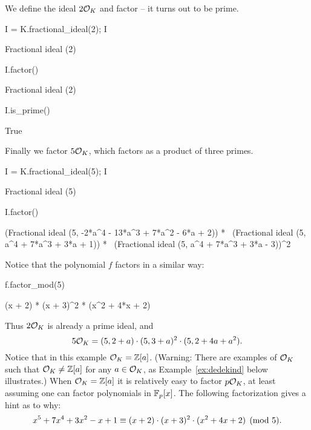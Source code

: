 \noindent
We define the ideal $2\mathcal{O}_K$ and factor -- it turns out to be prime.

\begin{sagecode}
\begin{sagecell}
I = K.fractional_ideal(2); I
\end{sagecell}
\begin{sageout}
Fractional ideal (2)
\end{sageout}
\begin{sagecell}
I.factor()
\end{sagecell}
\begin{sageout}
Fractional ideal (2)
\end{sageout}
\begin{sagecell}
I.is_prime()
\end{sagecell}
\begin{sageout}
True
\end{sageout}
\end{sagecode} %

\noindent
Finally we factor $5\mathcal{O}_K$, which factors as a product of three primes.

\begin{sagecode}
\begin{sagecell}
I = K.fractional_ideal(5); I
\end{sagecell}
\begin{sageout}
Fractional ideal (5)
\end{sageout}
\begin{sagecell}
I.factor()
\end{sagecell}
\begin{sageout}
(Fractional ideal (5, -2*a^4 - 13*a^3 + 7*a^2 - 6*a + 2)) * \
(Fractional ideal (5, a^4 + 7*a^3 + 3*a + 1)) * \
(Fractional ideal (5, a^4 + 7*a^3 + 3*a - 3))^2
\end{sageout}
\end{sagecode} %

\noindent
Notice that the polynomial $f$ factors in a similar way:

\begin{sagecode} %
\begin{sagecell}
f.factor_mod(5)
\end{sagecell}
\begin{sageout}
(x + 2) * (x + 3)^2 * (x^2 + 4*x + 2)
\end{sageout}
\end{sagecode}
Thus $2\mathcal{O}_K$ is already a prime ideal, and
$$
	5\mathcal{O}_K = (5,2+a)\cdot(5,3+a)^2\cdot(5,2+4a+a^2).
$$
Notice that in this example $\mathcal{O}_K=\mathbb{Z}[a]$. (Warning: There are examples of
$\mathcal{O}_K$ such that $\mathcal{O}_K\neq \mathbb{Z}[a]$ for any $a\in\mathcal{O}_K$, as
Example~\ref{ex:dedekind} below illustrates.) When $\mathcal{O}_K=\mathbb{Z}[a]$ it is
relatively easy to factor $p\mathcal{O}_K$, at least assuming one can factor
polynomials in $\mathbb{F}_p[x]$.
The following factorization gives a hint as to why:
$$
	x^5+7x^4+3x^2-x+1 \equiv (x+2)\cdot (x+3)^2 \cdot (x^2+4x+2)\pmod{5}.
$$

